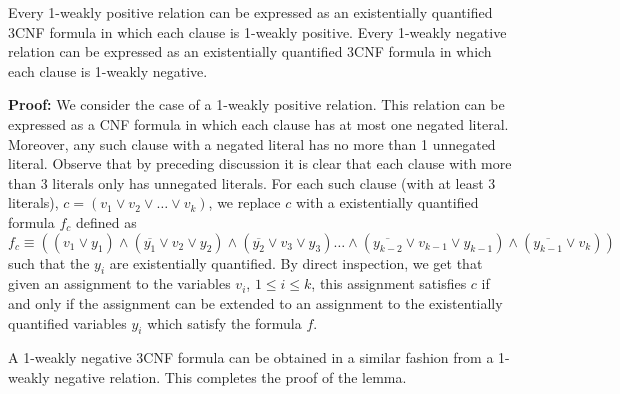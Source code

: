 \begin{lemma}\label{le:satwnto3wn}
Every 1-weakly positive relation can be expressed as an existentially
quantified 3CNF formula
in which each clause is 1-weakly positive.
Every 1-weakly negative relation can be expressed as an existentially
quantified  3CNF formula
in which each clause is 1-weakly negative.
\end{lemma}


\noindent
{\bf Proof:}
We consider the case of a 1-weakly positive relation. This relation can be
expressed as a {\sf CNF} formula in which each clause has at most one negated
literal. Moreover, any such clause with a negated literal has no more than 
1 unnegated literal.
Observe that by preceding discussion it is clear that 
each clause with more than 3 literals only has unnegated
literals. For each such clause (with at least 3 literals),
$c=(v_1 \vee v_2 \vee \ldots \vee v_k)$, 
we replace $c$ with a existentially  quantified formula
$f_c$ defined as 
\[f_c \equiv \left((v_1 \vee y_1) \wedge (\overline {y_1} \vee v_2 \vee y_2)
\wedge (\overline {y_2} \vee v_3 \vee y_3) \ldots
\wedge (\overline {y_{k-2}} \vee v_{k-1} \vee y_{k-1}) 
\wedge (\overline {y_{k-1}} \vee v_{k}) \right)\]
such that the $y_i$ are existentially quantified.
By direct inspection, we get that
given an assignment to the variables $v_i$, $1 \leq i \leq k$, 
this assignment satisfies $c$ if and only if
the assignment can be extended to an assignment to the existentially 
quantified  variables $y_i$ which satisfy the formula $f$. 

A 1-weakly negative {\sf 3CNF} formula can be obtained in a similar fashion
from a 1-weakly negative relation. This completes the proof of the lemma. \hfill\QED

